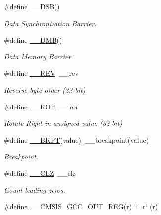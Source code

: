 \begin{DoxyCompactItemize}
\#define \mbox{\hyperlink{group___c_m_s_i_s___core___instruction_interface_ga067d257a2b34565410acefb5afef2203}{\+\_\+\+\_\+\+D\+SB}}()
\begin{DoxyCompactList}\small\item\em Data Synchronization Barrier. \end{DoxyCompactList}\item 
\#define \mbox{\hyperlink{group___c_m_s_i_s___core___instruction_interface_ga671101179b5943990785f36f8c1e2269}{\+\_\+\+\_\+\+D\+MB}}()
\begin{DoxyCompactList}\small\item\em Data Memory Barrier. \end{DoxyCompactList}\item 
\#define \mbox{\hyperlink{group___c_m_s_i_s___core___instruction_interface_ga14f54807872c0f5e05604c4924abfdae}{\+\_\+\+\_\+\+R\+EV}}~\+\_\+\+\_\+rev
\begin{DoxyCompactList}\small\item\em Reverse byte order (32 bit) \end{DoxyCompactList}\item 
\#define \mbox{\hyperlink{group___c_m_s_i_s___core___instruction_interface_ga95b9bd281ddeda378b85afdb8f2ced86}{\+\_\+\+\_\+\+R\+OR}}~\+\_\+\+\_\+ror
\begin{DoxyCompactList}\small\item\em Rotate Right in unsigned value (32 bit) \end{DoxyCompactList}\item 
\#define \mbox{\hyperlink{group___c_m_s_i_s___core___instruction_interface_ga15ea6bd3c507d3e81c3b3a1258e46397}{\+\_\+\+\_\+\+B\+K\+PT}}(value)~\+\_\+\+\_\+breakpoint(value)
\begin{DoxyCompactList}\small\item\em Breakpoint. \end{DoxyCompactList}\item 
\#define \mbox{\hyperlink{group___c_m_s_i_s___core___instruction_interface_ga5d5bb1527e042be4a9fa5a33f65cc248}{\+\_\+\+\_\+\+C\+LZ}}~\+\_\+\+\_\+clz
\begin{DoxyCompactList}\small\item\em Count leading zeros. \end{DoxyCompactList}\item 
\#define \mbox{\hyperlink{group___c_m_s_i_s___core___instruction_interface_gabc17e391c13c71702366c67cba39c276}{\+\_\+\+\_\+\+C\+M\+S\+I\+S\+\_\+\+G\+C\+C\+\_\+\+O\+U\+T\+\_\+\+R\+EG}}(r)~\char`\"{}=r\char`\"{} (r)

\end{DoxyCompactItemize}
